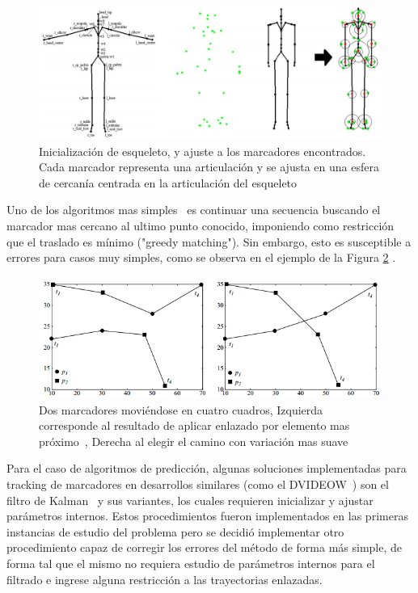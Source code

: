 \begin{figure}[ht!]
\begin{center}
\includegraphics[scale=0.6]{img/Tracking/01_skeleton_fitting_Herda.png}
\end{center}
\caption{Inicialización de esqueleto, y ajuste a los marcadores encontrados. Cada marcador representa una articulación y se ajusta en una esfera de cercanía centrada en la articulación del esqueleto}
\label{skeleton_fitting_herda}
\end{figure}

Uno de los algoritmos mas simples~\cite{survey_tracking} es continuar una secuencia buscando el marcador mas cercano al ultimo punto conocido, imponiendo como restricción que el traslado es mínimo ("greedy matching"). Sin embargo, esto es susceptible a errores para casos muy simples, como se observa en el ejemplo de la Figura \ref{greedy_matching} .

\begin{figure}[ht!]
\begin{center}
\includegraphics[scale=0.8]{img/Tracking/01_Greedy_Matching.png}
\end{center}
\caption{Dos marcadores moviéndose en cuatro cuadros, Izquierda corresponde al resultado de aplicar enlazado por elemento mas próximo~\cite{survey_tracking}, Derecha al elegir el camino con variación mas suave}
\label{greedy_matching}
\end{figure}

Para el caso de algoritmos de predicción, algunas soluciones implementadas para tracking de marcadores en desarrollos similares (como el DVIDEOW~\cite{figueroa2003flexible}) son el filtro de Kalman~\cite{kalman} y sus variantes, los cuales requieren inicializar y ajustar parámetros internos. Estos procedimientos fueron implementados en las primeras instancias de estudio del problema pero se decidió implementar otro procedimiento capaz de corregir los errores del método de forma más simple, de forma tal que el mismo no requiera estudio de parámetros internos para el filtrado e ingrese alguna restricción a las trayectorias enlazadas.
\\ 

